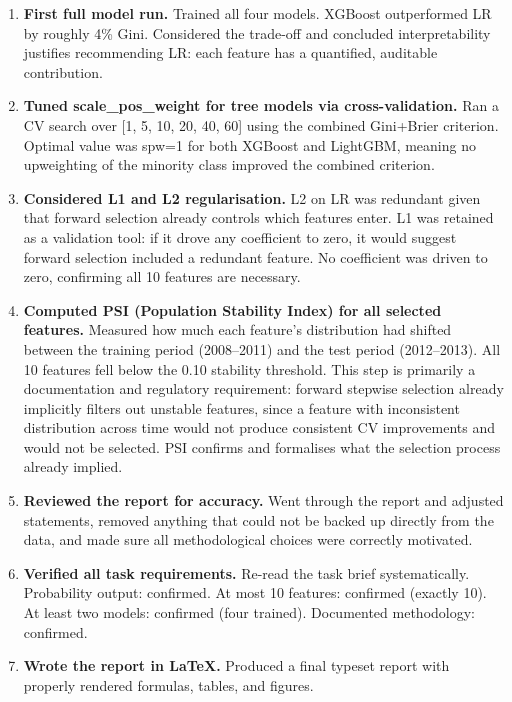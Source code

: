 \documentclass[a4paper,11pt]{article}
\begin{document}
\begin{enumerate}[leftmargin=1.5em, label=\textbf{Step \arabic*.}]
  \item \textbf{First full model run.}
        Trained all four models. XGBoost outperformed LR by roughly 4\% Gini.
        Considered the trade-off and concluded interpretability justifies recommending
        LR: each feature has a quantified, auditable contribution.

  \item \textbf{Tuned scale\_pos\_weight for tree models via cross-validation.}
        Ran a CV search over [1, 5, 10, 20, 40, 60] using the combined Gini+Brier
        criterion. Optimal value was spw=1 for both XGBoost and LightGBM, meaning
        no upweighting of the minority class improved the combined criterion.

  \item \textbf{Considered L1 and L2 regularisation.}
        L2 on LR was redundant given that forward selection already controls which
        features enter. L1 was retained as a validation tool: if it drove any
        coefficient to zero, it would suggest forward selection included a redundant
        feature. No coefficient was driven to zero, confirming all 10 features are necessary.

  \item \textbf{Computed PSI (Population Stability Index) for all selected features.}
        Measured how much each feature's distribution had shifted between the training
        period (2008--2011) and the test period (2012--2013). All 10 features fell
        below the 0.10 stability threshold. This step is primarily a documentation
        and regulatory requirement: forward stepwise selection already implicitly
        filters out unstable features, since a feature with inconsistent distribution
        across time would not produce consistent CV improvements and would not be
        selected. PSI confirms and formalises what the selection process already
        implied.

  \item \textbf{Reviewed the report for accuracy.}
        Went through the report and adjusted statements, removed anything that could
        not be backed up directly from the data, and made sure all methodological
        choices were correctly motivated.

  \item \textbf{Verified all task requirements.}
        Re-read the task brief systematically. Probability output: confirmed.
        At most 10 features: confirmed (exactly 10). At least two models: confirmed
        (four trained). Documented methodology: confirmed.

  \item \textbf{Wrote the report in \LaTeX.}
        Produced a final typeset report with properly rendered formulas, tables,
        and figures.

\end{enumerate}
\end{document}
